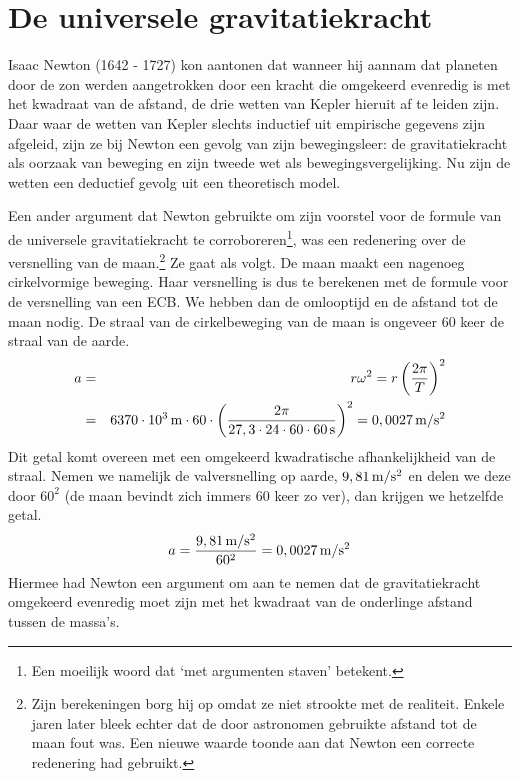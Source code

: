\documentclass{ximera}
\begin{document}
	\author{Bart Lambregs}
    \xmsource




	\section{De universele gravitatiekracht}

	
	
	Isaac Newton (1642 - 1727) kon aantonen dat wanneer hij aannam dat planeten door de zon werden aangetrokken door een kracht die omgekeerd evenredig is met het kwadraat van de afstand, de drie wetten van Kepler hieruit af te leiden zijn. Daar waar de wetten van Kepler slechts inductief uit empirische gegevens zijn afgeleid, zijn ze bij Newton een gevolg van zijn bewegingsleer: de gravitatiekracht als oorzaak van beweging en zijn tweede wet als bewegingsvergelijking. Nu zijn de wetten een deductief gevolg uit een theoretisch model.
	
	Een ander argument dat Newton gebruikte om zijn voorstel voor de formule van de universele gravitatiekracht te corroboreren\footnote{Een moeilijk woord dat `met argumenten staven' betekent.}, was een redenering over de versnelling van de maan.\footnote{Zijn berekeningen borg hij op omdat ze niet strookte met de realiteit. Enkele jaren later bleek echter dat de door astronomen gebruikte afstand tot de maan fout was. Een nieuwe waarde toonde aan dat Newton een correcte redenering had gebruikt.} Ze gaat als volgt. De maan maakt een nagenoeg cirkelvormige beweging. Haar versnelling is dus te berekenen met de formule voor de versnelling van een ECB. We hebben dan de omlooptijd en de afstand tot de maan nodig. De straal van de cirkelbeweging van de maan is ongeveer 60 keer de straal van de aarde.
	\begin{eqnarray*}
		a&=&r\omega^2=r\left(\frac{2\pi}{T}\right)^2\\
		&=&6370\cdot10^3\rm\,m\cdot60\cdot\left(\frac{2\pi}{27,3\cdot24\cdot60\cdot60\rm\,s}\right)^2=0,0027\rm\,m/s^2
	\end{eqnarray*}
	Dit getal komt overeen met een omgekeerd kwadratische afhankelijkheid van de straal. Nemen we namelijk de valversnelling op aarde, $9,81\rm\,m/s^2$ en delen we deze door $60^2$ (de maan bevindt zich immers 60 keer zo ver), dan krijgen we hetzelfde getal.
	\begin{eqnarray*}
		a=\frac{9,81\rm\,m/s^2}{60^2}=0,0027\rm\,m/s^2
	\end{eqnarray*}
	Hiermee had Newton een argument om aan te nemen dat de gravitatiekracht omgekeerd evenredig moet zijn met het kwadraat van de onderlinge afstand tussen de massa's.
	
\end{document}
